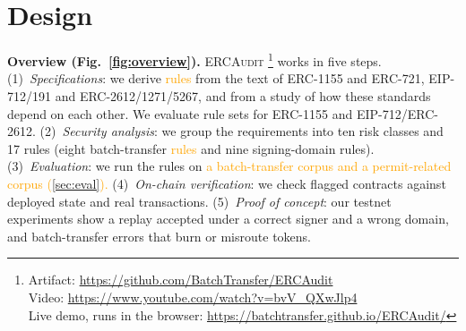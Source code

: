 \documentclass[10pt,conference]{IEEEtran}
\newcommand{\AS}[1]{\textcolor{orange}{#1}}
\newcommand{\tool}{\textsc{ERCAudit}\xspace}
\begin{document}

\section{Design}
\label{sec:design}
\textbf{Overview (Fig.~\ref{fig:overview}).} \tool{} \footnote{\scriptsize Artifact: \url{https://github.com/BatchTransfer/ERCAudit} \\ \hspace*{1em} Video: \url{https://www.youtube.com/watch?v=bvV_QXwJlp4} \\ \hspace*{1em} Live demo, runs in the browser: \url{https://batchtransfer.github.io/ERCAudit/}} works in five steps. (1)~\emph{Specifications}: we derive \AS{rules} from the text of
ERC-1155 and ERC-721, EIP-712/191 and ERC-2612/1271/5267, and from a study of how these standards depend on each other. %
We evaluate rule sets for ERC-1155 and EIP-712/ERC-2612.
(2)~\emph{Security analysis}: we group the requirements into ten risk classes and 17 rules (eight batch-transfer \AS{rules} and nine signing-domain
rules). %
(3)~\emph{Evaluation}: we run the rules on \AS{a batch-transfer corpus and a permit-related corpus (\cref{sec:eval}).} %
(4)~\emph{On-chain verification}: we check flagged contracts against deployed state and real transactions. (5)~\emph{Proof of concept}:
our testnet experiments show a replay accepted under a correct signer and a wrong domain, and batch-transfer errors that burn or misroute tokens.
\end{document}
